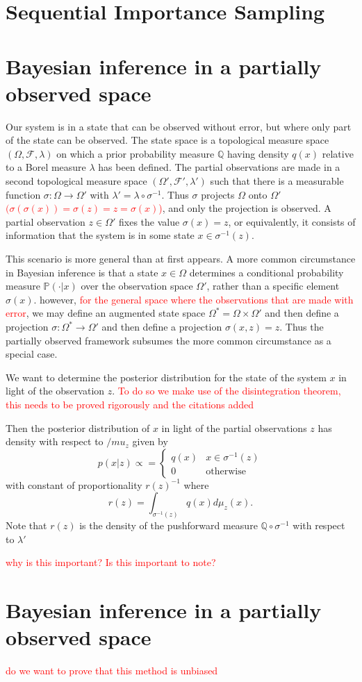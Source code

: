 \documentclass[11pt,a4paper]{article}
\renewcommand{\P}{\mathbb{P}}
\newcommand{\Q}{\mathbb{Q}}
\newcommand{\F}{\mathcal{F}}
\begin{document}
\section{Sequential Importance Sampling}



\section{Bayesian inference in a partially observed space}

Our system is in a state that can be observed without error, but where only part of the state can be observed. The state space is a topological measure space $(\Omega, \F, \lambda)$ on which a prior probability measure $\Q$ having density $q(x)$ relative to a Borel measure $\lambda$ has been defined. The partial observations are made in a second topological measure space $(\Omega', \F', \lambda')$ such that there is a measurable function $\sigma : \Omega \xrightarrow{} \Omega'$ with $\lambda' = \lambda \circ \sigma^{-1}$. Thus $\sigma$ projects $\Omega$ onto $\Omega'$ \textcolor{red}{$(\sigma(\sigma(x)) = \sigma(z) = z = \sigma(x)$)}, and only the projection is observed. A partial observation $z \in \Omega'$ fixes the value $\sigma(x) = z$, or equivalently, it consists of information that the system is in some state $x \in \sigma^{-1}(z)$.

This scenario is more general than at first appears. A more common circumstance in Bayesian inference is that a state $x \in \Omega$ determines a conditional probability measure $\P(\cdot |x)$ over the observation space $\Omega'$, rather than a specific element $\sigma(x)$. however, \textcolor{red}{for the general space where the observations that are made with error}, we may define an augmented state space $\Omega^\ast= \Omega \times \Omega'$ and then define a projection $\sigma: \Omega^\ast \xrightarrow{}\Omega'$ and then define a projection $\sigma(x, z) = z$. Thus the partially observed framework subsumes the more common circumstance as a special case.

We want to determine the posterior distribution for the state of the system $x$ in light of the observation $z$. \textcolor{red}{To do so we make use of the disintegration theorem, this needs to be proved rigorously and the citations added}

Then the posterior distribution of $x$ in light of the partial observations $z$ has density with respect to $/mu_z$ given by 
\[
    p(x|z) \propto = \begin{cases} q(x) & x \in \sigma^{-1}(z) \\ 0 &\mbox{otherwise} \end{cases}
\]
with constant of proportionality $r(z)^{-1}$ where
\[
    r(z) = \int_{\sigma^{-1}(z)} q(x)d\mu_z(x).
\]
Note that $r(z)$ is the density of the pushforward measure $\Q \circ \sigma^{-1}$ with respect to $\lambda'$

\textcolor{red}{why is this important? Is this important to note?}

\section{Bayesian inference in a partially observed space}




\textcolor{red}{do we want to prove that this method is unbiased}
\end{document}
